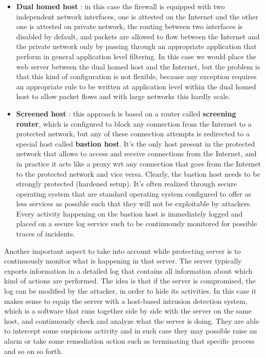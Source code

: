 \begin{itemize}
\item \textbf{Dual homed host} : in this case the firewall is equipped with two independent network interfaces, one is attested on the Internet and the other one is attested on private network, the routing between two interfaces is disabled by default, and packets are allowed to flow between the Internet and the private network only by passing through an appropriate application that perform in general application level filtering. In this case we would place the web server between the dual homed host and the Internet, but the problem is that this kind of configuration is not flexible, because any exception requires an appropriate rule to be written at application level within the dual homed host to allow packet flows and with large networks this hardly scale.
\item \textbf{Screened host} : this approach is based on a router called \textbf{screening router}, which is configured to block any connection from the Internet to a protected network, but any of these connection attempts is redirected to a special host called \textbf{bastion host}. It's the only host present in the protected network that allows to access and receive connections from the Internet, and in practice it acts like a proxy wrt any connection that goes from the Internet to the protected network and vice versa. Clearly, the bastion host needs to be strongly protected (hardened setup). It's often realized through secure operating system that are standard operating system configured to offer as less services as possible such that they will not be exploitable by attackers. Every activity happening on the bastion host is immediately logged and placed on a secure log service such to be continuously monitored for possible traces of incidents.
\end{itemize}
Another important aspect to take into account while protecting server is to continuously monitor what is happening in that server. The server typically exports information in a  detailed log that contains all information about which kind of actions are performed. The idea is that if the server is compromised, the log can be modified by the attacker, in order to hide its activities. In this case it makes sense to equip the server with a host-based intrusion detection system, which is a software that runs together side by side with the server on the same host, and continuously check and analyze what the server is doing. They are able to intercept some suspicious activity and in such case they may possible raise an alarm or take some remediation action such as terminating that specific process and so on so forth.

